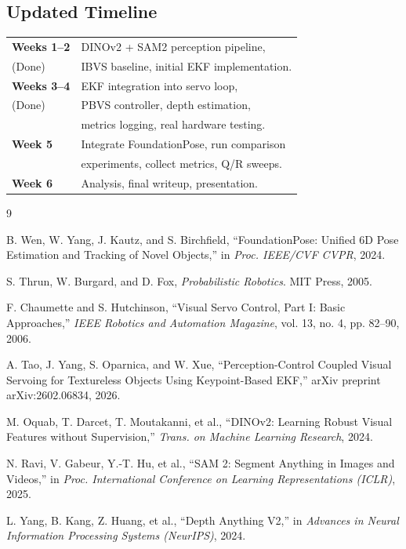 \documentclass[letterpaper, 10 pt, conference]{ieeeconf}  %
\begin{document}
\subsection{Updated Timeline}

\begin{tabular}{l l}
\textbf{Weeks 1--2} & DINOv2 + SAM2 perception pipeline, \\
(Done) & IBVS baseline, initial EKF implementation. \\[2pt]
\textbf{Weeks 3--4} & EKF integration into servo loop, \\
(Done) & PBVS controller, depth estimation, \\
& metrics logging, real hardware testing. \\[2pt]
\textbf{Week 5} & Integrate FoundationPose, run comparison \\
& experiments, collect metrics, Q/R sweeps. \\[2pt]
\textbf{Week 6} & Analysis, final writeup, presentation. \\
\end{tabular}



\begin{thebibliography}{9}

 B. Wen, W. Yang, J. Kautz, and S. Birchfield, ``FoundationPose: Unified 6D Pose Estimation and Tracking of Novel Objects,'' in \textit{Proc. IEEE/CVF CVPR}, 2024.

 S. Thrun, W. Burgard, and D. Fox, \textit{Probabilistic Robotics}. MIT Press, 2005.

 F. Chaumette and S. Hutchinson, ``Visual Servo Control, Part I: Basic Approaches,'' \textit{IEEE Robotics and Automation Magazine}, vol. 13, no. 4, pp. 82--90, 2006.

A. Tao, J. Yang, S. Oparnica, and W. Xue, ``Perception-Control Coupled Visual Servoing for Textureless Objects Using Keypoint-Based EKF,'' arXiv preprint arXiv:2602.06834, 2026.

M. Oquab, T. Darcet, T. Moutakanni, et al., ``DINOv2: Learning Robust Visual Features without Supervision,'' \textit{Trans. on Machine Learning Research}, 2024.

N. Ravi, V. Gabeur, Y.-T. Hu, et al., ``SAM 2: Segment Anything in Images and Videos,'' in \textit{Proc. International Conference on Learning Representations (ICLR)}, 2025.

L. Yang, B. Kang, Z. Huang, et al., ``Depth Anything V2,'' in \textit{Advances in Neural Information Processing Systems (NeurIPS)}, 2024.

\end{thebibliography}
\end{document}
